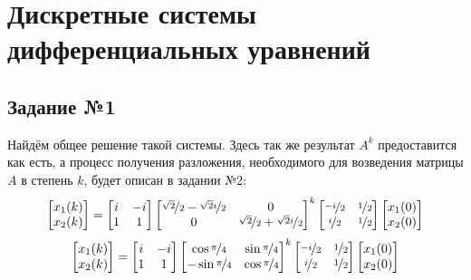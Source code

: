 \documentclass[a3paper,14pt]{extarticle}
\begin{document}
\section*{\centering Дискретные системы дифференциальных уравнений}
\subsection*{\centering Задание №1}
Найдём общее решение такой системы. Здесь так же результат $A^k$ предоставится как есть, а процесс получения разложения, необходимого для возведения матрицы $A$ в степень $k$, будет описан в задании №2:
$$\begin{bmatrix}
    x_1(k) \\ x_2(k)
\end{bmatrix} = \begin{bmatrix}
    i & -i \\ 1 & 1 
\end{bmatrix}\begin{bmatrix}
    \nicefrac{\sqrt{2}}{2} - \nicefrac{\sqrt{2}i}{2} & 0 \\ 0 & \nicefrac{\sqrt{2}}{2} + \nicefrac{\sqrt{2}i}{2}
\end{bmatrix}^k\begin{bmatrix}
    \nicefrac{-i}{2} & \nicefrac{1}{2} \\ \nicefrac{i}{2} & \nicefrac{1}{2}
\end{bmatrix}\begin{bmatrix}
    x_1(0) \\ x_2(0)
\end{bmatrix}$$
$$\begin{bmatrix}
    x_1(k) \\ x_2(k)
\end{bmatrix} = \begin{bmatrix}
    i & -i \\ 1 & 1 
\end{bmatrix}\begin{bmatrix}
    \cos{\nicefrac{\pi}{4}} & \sin{\nicefrac{\pi}{4}} \\ -\sin{\nicefrac{\pi}{4}} & \cos{\nicefrac{\pi}{4}}
\end{bmatrix}^k\begin{bmatrix}
    \nicefrac{-i}{2} & \nicefrac{1}{2} \\ \nicefrac{i}{2} & \nicefrac{1}{2}
\end{bmatrix}\begin{bmatrix}
    x_1(0) \\ x_2(0)
\end{bmatrix}$$
\end{document}
